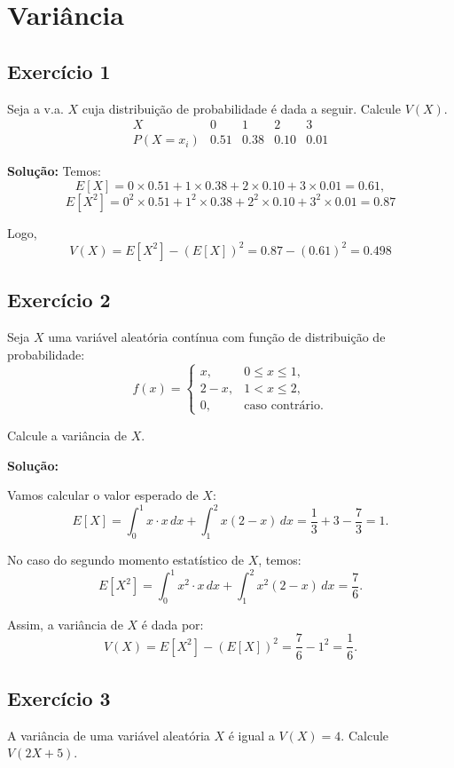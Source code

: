 \documentclass{article}
\begin{document}
\section{Variância}
\subsection{Exercício 1}
Seja a v.a. $X$ cuja distribuição de probabilidade é dada a seguir. Calcule $V(X)$.
    $$
    \begin{array}{c|cccc}
    X & 0 & 1 & 2 & 3 \\ \hline
    P(X = x_i) & 0.51 & 0.38 & 0.10 & 0.01
    \end{array}
    $$

\vspace{0.5cm}
\textbf{Solução:}
Temos:
    $$
    E[X] = 0 \times 0.51 + 1 \times 0.38 + 2 \times 0.10 + 3 \times 0.01 = 0.61,
    $$
    $$
    E[X^2] = 0^2 \times 0.51 + 1^2 \times 0.38 + 2^2 \times 0.10 + 3^2 \times 0.01 = 0.87
    $$

Logo,
    $$
    V(X) = E[X^2] - (E[X])^2 = 0.87 - (0.61)^2 = 0.498
    $$

\subsection{Exercício 2}
Seja $X$ uma variável aleatória contínua com função de distribuição de probabilidade:
    $$
    f(x) =
    \begin{cases}
    x, & 0 \leq x \leq 1, \\
    2 - x, & 1 < x \leq 2, \\
    0, & \text{caso contrário}.
    \end{cases}
    $$

Calcule a variância de $X$.

\vspace{0.5cm}
\textbf{Solução:}

Vamos calcular o valor esperado de $X$:
    $$
    E[X] = \int_0^1 x \cdot x \, dx + \int_1^2 x (2 - x) \, dx = \frac{1}{3} + 3 - \frac{7}{3} = 1.
    $$

No caso do segundo momento estatístico de $X$, temos:
    $$
    E[X^2] = \int_0^1 x^2 \cdot x \, dx + \int_1^2 x^2 (2 - x) \, dx = \frac{7}{6}.
    $$

Assim, a variância de $X$ é dada por:
    $$
    V(X) = E[X^2] - (E[X])^2 = \frac{7}{6} - 1^2 = \frac{1}{6}.
    $$

\subsection{Exercício 3}
A variância de uma variável aleatória $X$ é igual a $V(X) = 4$. Calcule $V(2X + 5)$.
\end{document}
